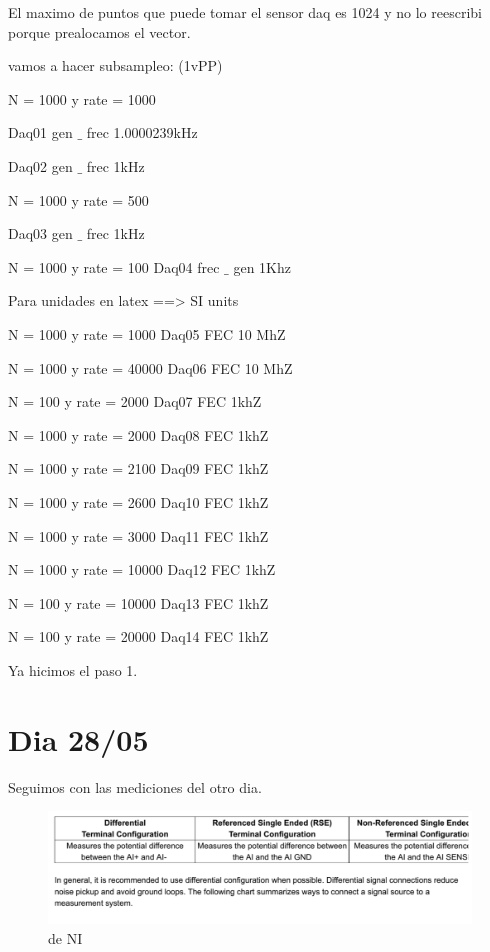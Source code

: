 \documentclass[a4paper,12pt]{article}
\begin{document}
El maximo de puntos que puede tomar el sensor daq es 1024 y no lo reescribi porque prealocamos el vector.  

vamos a hacer subsampleo: (1vPP)

N = 1000 y rate = 1000

Daq01 gen $\_$ frec 1.0000239kHz  

Daq02 gen $\_$ frec 1kHz

N = 1000 y rate = 500

Daq03 gen $\_$ frec 1kHz 

N = 1000 y rate = 100
Daq04 frec $\_$ gen 1Khz


Para unidades en latex ==> SI units 

N = 1000 y rate = 1000
Daq05 FEC 10 MhZ

N = 1000 y rate = 40000
Daq06 FEC 10 MhZ

N = 100 y rate = 2000
Daq07 FEC 1khZ

N = 1000 y rate = 2000
Daq08 FEC 1khZ

N = 1000 y rate = 2100
Daq09 FEC 1khZ

N = 1000 y rate = 2600
Daq10 FEC 1khZ

N = 1000 y rate = 3000
Daq11 FEC 1khZ

N = 1000 y rate = 10000
Daq12 FEC 1khZ

N = 100 y rate = 10000
Daq13 FEC 1khZ

N = 100 y rate = 20000
Daq14 FEC 1khZ

Ya hicimos el paso 1. 

\section{Dia 28/05}
Seguimos con las mediciones del otro dia. 

\begin{figure}
    \centering
    \includegraphics[scale=0.4]{imagenes/SNRE1.pdf}
    \caption{de NI}
    \label{fig:snre1}
\end{figure}
\end{document}
